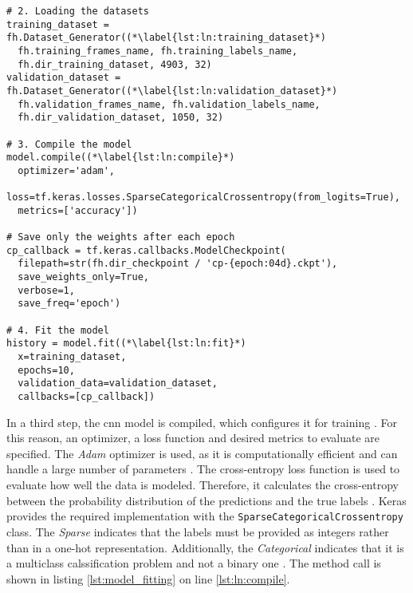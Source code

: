 \begin{lstlisting}[style=python, caption={Training of the model}, label=lst:model_fitting]
# 2. Loading the datasets
training_dataset = fh.Dataset_Generator((*\label{lst:ln:training_dataset}*)
  fh.training_frames_name, fh.training_labels_name,
  fh.dir_training_dataset, 4903, 32)
validation_dataset = fh.Dataset_Generator((*\label{lst:ln:validation_dataset}*)
  fh.validation_frames_name, fh.validation_labels_name,
  fh.dir_validation_dataset, 1050, 32)

# 3. Compile the model
model.compile((*\label{lst:ln:compile}*)
  optimizer='adam',
  loss=tf.keras.losses.SparseCategoricalCrossentropy(from_logits=True),
  metrics=['accuracy'])

# Save only the weights after each epoch
cp_callback = tf.keras.callbacks.ModelCheckpoint(
  filepath=str(fh.dir_checkpoint / 'cp-{epoch:04d}.ckpt'),
  save_weights_only=True,
  verbose=1,
  save_freq='epoch')

# 4. Fit the model
history = model.fit((*\label{lst:ln:fit}*)
  x=training_dataset,
  epochs=10,
  validation_data=validation_dataset,
  callbacks=[cp_callback])
\end{lstlisting}

In a third step, the \acrshort{cnn} model is compiled, which configures it for training \cite{training_arch_tf_keras_sequential}.
For this reason, an optimizer, a loss function and desired metrics to evaluate are specified.
The \textit{Adam} optimizer is used, as it is computationally efficient and can handle a large number of parameters \cite{training_arch_adam}.
The cross-entropy loss function is used to evaluate how well the data is modeled.
Therefore, it calculates the cross-entropy between the probability distribution of the predictions and the true labels \cite{training_train_entropy}. 
Keras provides the required implementation with the \texttt{SparseCategoricalCrossentropy} class.
The \textit{Sparse} indicates that the labels must be provided as integers rather than in a one-hot representation.
Additionally, the \textit{Categorical} indicates that it is a multiclass calssification problem and not a binary one \cite{training_train_tf_keras_crossentropy}.
The method call is shown in listing \ref{lst:model_fitting} on line \ref{lst:ln:compile}.

